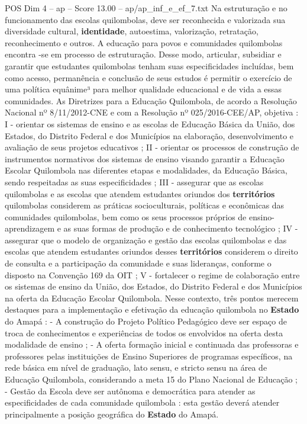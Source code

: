 \begin{textsample}{POS Dim 4 – ap – Score 13.00 – ap/ap\_inf\_e\_ef\_7.txt}
Na estruturação e no funcionamento das escolas quilombolas, deve ser reconhecida e valorizada sua diversidade cultural, \textbf{identidade}, autoestima, valorização, retratação, reconhecimento e outros.
A educação para povos e comunidades quilombolas encontra -se em processo de estruturação.
Desse modo, articular, subsidiar e garantir que estudantes quilombolas tenham suas especificidades incluídas, bem como acesso, permanência e conclusão de seus estudos é permitir o exercício de uma política equânime³ para melhor qualidade educacional e de vida a essas comunidades.
As Diretrizes para a Educação Quilombola, de acordo a Resolução Nacional nº 8/11/2012-CNE e com a Resolução nº 025/2016-CEE/AP, objetiva : I - orientar os sistemas de ensino e as escolas de Educação Básica da União, dos Estados, do Distrito Federal e dos Municípios na elaboração, desenvolvimento e avaliação de seus projetos educativos ; II - orientar os processos de construção de instrumentos normativos dos sistemas de ensino visando garantir a Educação Escolar Quilombola nas diferentes etapas e modalidades, da Educação Básica, sendo respeitadas as suas especificidades ; III - assegurar que as escolas quilombolas e as escolas que atendem estudantes oriundos dos \textbf{territórios} quilombolas considerem as práticas socioculturais, políticas e econômicas das comunidades quilombolas, bem como os seus processos próprios de ensino-aprendizagem e as suas formas de produção e de conhecimento tecnológico ; IV - assegurar que o modelo de organização e gestão das escolas quilombolas e das escolas que atendem estudantes oriundos desses \textbf{territórios} considerem o direito de consulta e a participação da comunidade e suas lideranças, conforme o disposto na Convenção 169 da OIT ; V - fortalecer o regime de colaboração entre os sistemas de ensino da União, dos Estados, do Distrito Federal e dos Municípios na oferta da Educação Escolar Quilombola.
Nesse contexto, três pontos merecem destaques para a implementação e efetivação da educação quilombola no \textbf{Estado} do Amapá : - A construção do Projeto Político Pedagógico deve ser espaço de troca de conhecimentos e experiências de todos os envolvidos na oferta desta modalidade de ensino ; - A oferta formação inicial e continuada das professoras e professores pelas instituições de Ensino Superiores de programas específicos, na rede básica em nível de graduação, lato sensu, e stricto sensu na área de Educação Quilombola, considerando a meta 15 do Plano Nacional de Educação ; - Gestão da Escola deve ser autônoma e democrática para atender as especificidades de cada comunidade quilombola : esta gestão deverá atender principalmente a posição geográfica do \textbf{Estado} do Amapá.

\end{textsample}
